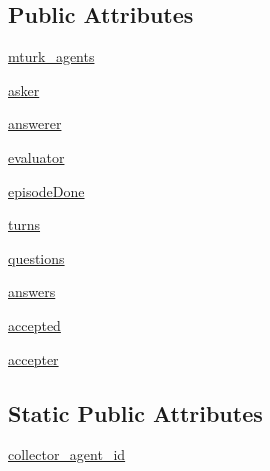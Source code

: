 \subsection*{Public Attributes}
\begin{DoxyCompactItemize}
\item 
\hyperlink{classparlai_1_1mturk_1_1tasks_1_1react__task__demo_1_1react__custom__no__extra__deps_1_1worlds_1_1MultiRoleAgentWorld_ae3748095c759d2bd795303c29d84b425}{mturk\+\_\+agents}
\item 
\hyperlink{classparlai_1_1mturk_1_1tasks_1_1react__task__demo_1_1react__custom__no__extra__deps_1_1worlds_1_1MultiRoleAgentWorld_aa7935daa793cbe2037141aea0db91d9e}{asker}
\item 
\hyperlink{classparlai_1_1mturk_1_1tasks_1_1react__task__demo_1_1react__custom__no__extra__deps_1_1worlds_1_1MultiRoleAgentWorld_af670c69b1411ca3d814e2df0bd1049db}{answerer}
\item 
\hyperlink{classparlai_1_1mturk_1_1tasks_1_1react__task__demo_1_1react__custom__no__extra__deps_1_1worlds_1_1MultiRoleAgentWorld_a243e69565700fe850bf0bf86d5a7caa4}{evaluator}
\item 
\hyperlink{classparlai_1_1mturk_1_1tasks_1_1react__task__demo_1_1react__custom__no__extra__deps_1_1worlds_1_1MultiRoleAgentWorld_a5a394e74d62521df26e45dfdd8ee9763}{episode\+Done}
\item 
\hyperlink{classparlai_1_1mturk_1_1tasks_1_1react__task__demo_1_1react__custom__no__extra__deps_1_1worlds_1_1MultiRoleAgentWorld_a33558f1a957ca6ed6933f36ff50017d9}{turns}
\item 
\hyperlink{classparlai_1_1mturk_1_1tasks_1_1react__task__demo_1_1react__custom__no__extra__deps_1_1worlds_1_1MultiRoleAgentWorld_a4dfe1964fa40009c3fafd5e24a2917bc}{questions}
\item 
\hyperlink{classparlai_1_1mturk_1_1tasks_1_1react__task__demo_1_1react__custom__no__extra__deps_1_1worlds_1_1MultiRoleAgentWorld_a68d2b58691edc6e41584018e419e9c79}{answers}
\item 
\hyperlink{classparlai_1_1mturk_1_1tasks_1_1react__task__demo_1_1react__custom__no__extra__deps_1_1worlds_1_1MultiRoleAgentWorld_a9f87c9800c646c43458925554bfba794}{accepted}
\item 
\hyperlink{classparlai_1_1mturk_1_1tasks_1_1react__task__demo_1_1react__custom__no__extra__deps_1_1worlds_1_1MultiRoleAgentWorld_a3500e6b1c475e4bfcc9c6c53c6604904}{accepter}
\end{DoxyCompactItemize}
\subsection*{Static Public Attributes}
\begin{DoxyCompactItemize}
\item 
\hyperlink{classparlai_1_1mturk_1_1tasks_1_1react__task__demo_1_1react__custom__no__extra__deps_1_1worlds_1_1MultiRoleAgentWorld_adfe19288ecd4fcde6d0557f61dc4ec11}{collector\+\_\+agent\+\_\+id}
\end{DoxyCompactItemize}


